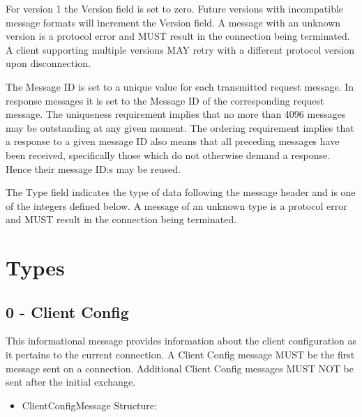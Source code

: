 For version 1 the Version field is set to zero. Future versions with
incompatible message formats will increment the Version field. A
message with an unknown version is a protocol error and MUST result
in the connection being terminated. A client supporting multiple
versions MAY retry with a different protocol version upon disconnection.

The Message ID is set to a unique value for each transmitted request
message. In response messages it is set to the Message ID of the
corresponding request message. The uniqueness requirement implies that
no more than 4096 messages may be outstanding at any given moment. The
ordering requirement implies that a response to a given message ID also
means that all preceding messages have been received, specifically
those which do not otherwise demand a response. Hence their message
ID:s may be reused.

The Type field indicates the type of data following the message header
and is one of the integers defined below. A message of an unknown type
is a protocol error and MUST result in the connection being terminated.


\section{Types}
\subsection{0 - Client Config}

This informational message provides information about the client
configuration as it pertains to the current connection. A Client
Config message MUST be the first message sent on a connection.
Additional Client Config messages MUST NOT be sent after the initial
exchange.

\begin{itemize}
 \item ClientConfigMessage Structure:
\end{itemize}

